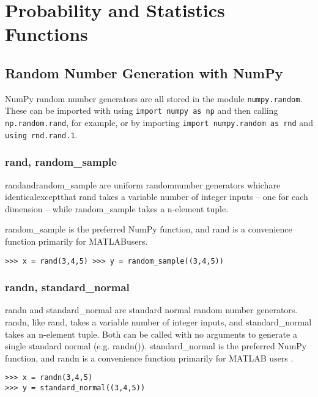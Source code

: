 \documentclass[KSmain.tex]{subfiles}
\begin{document}
 
\section{Probability and Statistics Functions}
\subsection{Random Number Generation with NumPy}
NumPy random number generators are all stored in the module \texttt{numpy.random}. 
These can be imported with using \texttt{import numpy as np} and then calling \texttt{np.random.rand}, for example, or 
by importing \texttt{import numpy.random as rnd} and \texttt{using rnd.rand.1}.
\subsubsection{rand, random\_sample}
randandrandom\_sample are uniform randomnumber generators whichare
 identicalexceptthat rand takes a variable number 
of integer inputs – one for each dimension – while random\_sample takes a n-element tuple. 

random\_sample is the preferred NumPy function, and rand is a convenience function primarily for MATLABusers.
\begin{framed}
\begin{verbatim}
>>> x = rand(3,4,5) >>> y = random_sample((3,4,5))
\end{verbatim}
\end{framed}


\subsubsection{randn, standard\_normal}
randn and standard\_normal are standard normal random number generators. randn, like rand, takes a
variable number of integer inputs, and standard_normal takes an n-element tuple. Both can be called
with no arguments to generate a single standard normal (e.g. randn()). standard_normal is the preferred
NumPy function, and randn is a convenience function primarily for MATLAB users .
\begin{framed}
\begin{verbatim}
>>> x = randn(3,4,5)
>>> y = standard_normal((3,4,5))
\end{verbatim}
\end{framed}
\end{document}

